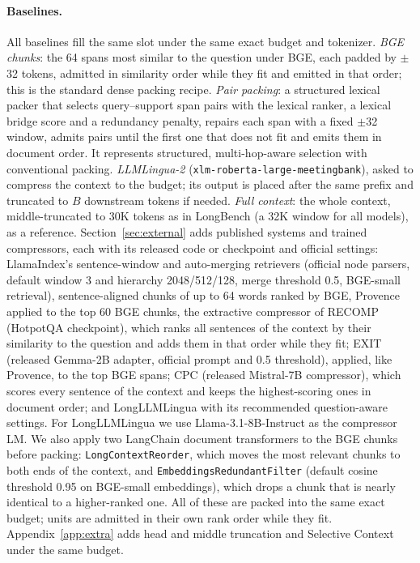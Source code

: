 \documentclass[11pt]{article}
\begin{document}
\paragraph{Baselines.} All baselines fill the same slot under the same exact budget and tokenizer.
\emph{BGE chunks}: the 64 spans most similar to the question under BGE, each padded by $\pm$32 tokens, admitted in similarity order while they fit and emitted in that order; this is the standard dense packing recipe.
\emph{Pair packing}: a structured lexical packer that selects query--support span pairs with the lexical ranker, a lexical bridge score and a redundancy penalty, repairs each span with a fixed $\pm$32 window, admits pairs until the first one that does not fit and emits them in document order. It represents structured, multi-hop-aware selection with conventional packing.
\emph{LLMLingua-2} \citep{pan2024llmlingua2} (\texttt{xlm-roberta-large-meetingbank}), asked to compress the context to the budget; its output is placed after the same prefix and truncated to $B$ downstream tokens if needed.
\emph{Full context}: the whole context, middle-truncated to 30K tokens as in LongBench (a 32K window for all models), as a reference.
Section~\ref{sec:external} adds published systems and trained compressors, each with its released code or checkpoint and official settings: LlamaIndex's sentence-window and auto-merging retrievers \citep{liu2022llamaindex} (official node parsers, default window 3 and hierarchy 2048/512/128, merge threshold 0.5, BGE-small retrieval), sentence-aligned chunks of up to 64 words ranked by BGE, Provence \citep{chirkova2025provence} applied to the top 60 BGE chunks, the extractive compressor of RECOMP \citep{xu2023recomp} (HotpotQA checkpoint), which ranks all sentences of the context by their similarity to the question and adds them in that order while they fit; EXIT \citep{hwang2025exit} (released Gemma-2B adapter, official prompt and 0.5 threshold), applied, like Provence, to the top BGE spans; CPC \citep{liskavets2025cpc} (released Mistral-7B compressor), which scores every sentence of the context and keeps the highest-scoring ones in document order; and LongLLMLingua \citep{jiang2024longllmlingua} with its recommended question-aware settings. For LongLLMLingua we use Llama-3.1-8B-Instruct as the compressor LM. We also apply two LangChain document transformers \citep{chase2022langchain} to the BGE chunks before packing: \texttt{LongContextReorder}, which moves the most relevant chunks to both ends of the context, and \texttt{EmbeddingsRedundantFilter} (default cosine threshold 0.95 on BGE-small embeddings), which drops a chunk that is nearly identical to a higher-ranked one. All of these are packed into the same exact budget; units are admitted in their own rank order while they fit.
Appendix~\ref{app:extra} adds head and middle truncation and Selective Context under the same budget.
\end{document}
